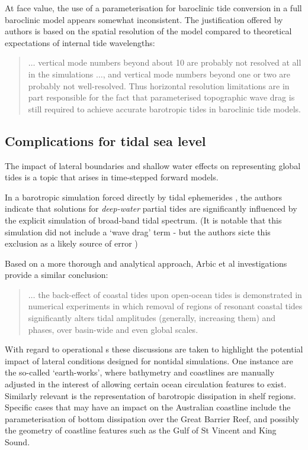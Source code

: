 At face value, the use of a parameterisation for baroclinic tide conversion in a full baroclinic model appears somewhat inconsistent.   The justification offered by authors is based on the spatial resolution of the model compared to theoretical expectations of internal tide wavelengths:
\noindent \begin{quotation}
$\dots{}$  vertical mode numbers beyond about 10 are probably not resolved at all in the simulations $\dots{}$, and vertical mode numbers beyond one or two are probably not well-resolved. Thus horizontal resolution limitations are in part responsible for the fact that parameterised topographic wave drag is still required to achieve accurate barotropic tides in baroclinic tide models. \citep[pp177]{Arbic:2010us}
\end{quotation}



\subsection{Complications for tidal sea level}

The impact of lateral boundaries and shallow water effects on representing global tides is a topic that arises in time-stepped forward models.

In a barotropic simulation forced directly by tidal ephemerides \cite{Weis:2008ex}, the authors indicate that solutions for \emph{deep-water} partial tides are significantly influenced by the explicit simulation of broad-band tidal spectrum.   
(It is notable that this simulation did not include a `wave drag' term - but the authors sicte this exclusion as a likely source of error \citep[pp5]{Weis:2008ex})


Based on a more thorough and analytical approach, Arbic et al investigations provide a similar conclusion:
\noindent \begin{quotation}
$\dots{}$ the back-effect of coastal tides upon open-ocean tides is demonstrated in numerical experiments in which removal of regions of resonant coastal tides significantly alters tidal amplitudes (generally, increasing them) and phases, over basin-wide and even global scales.\citep[pp263]{Arbic:2009in}
\end{quotation}

With regard to operational \OGCM{}s these discussions are taken to highlight the potential impact of lateral conditions designed for nontidal simulations.  
One instance are the so-called `earth-works', where bathymetry and coastlines are manually adjusted in the interest of allowing certain ocean circulation features to exist.  
Similarly relevant is the representation of barotropic dissipation in shelf regions. 
Specific cases that may have an impact on the Australian coastline include the parameterisation of bottom dissipation over the Great Barrier Reef, and possibly the geometry of coastline features such as the Gulf of St Vincent and King Sound.



